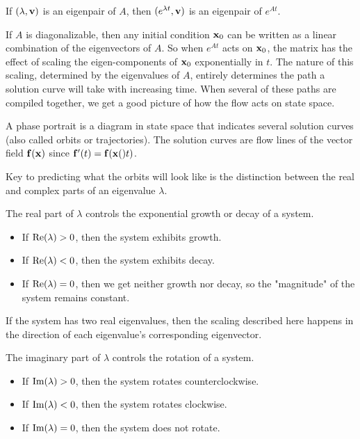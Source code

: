 \documentclass[../m082main.tex]{subfiles}
\begin{document}
\begin{theorem}
    If $(\lambda, \mathbf{v})$ is an eigenpair of $A$, then $(e^{\lambda t}, \mathbf{v})$ is an eigenpair of $e^{At}$.
\end{theorem}

If $A$ is diagonalizable, then any initial condition $\mathbf{x}_0$ can be written as a linear combination of the eigenvectors of $A$.
So when $e^{At}$ acts on $\mathbf{x}_0$, the matrix has the effect of scaling the eigen-components of $\mathbf{x}_0$ exponentially in $t$.
The nature of this scaling, determined by the eigenvalues of $A$, entirely determines the path a solution curve will take with increasing time.
When several of these paths are compiled together, we get a good picture of how the flow acts on state space.

\begin{definition}
    A phase portrait is a diagram in state space that indicates several solution curves (also called orbits or trajectories).
    The solution curves are flow lines of the vector field $\mathbf{f}(\mathbf{x})$ since $\mathbf{f}'(t) = \mathbf{f}(\mathbf{x}()t)$.
\end{definition}

Key to predicting what the orbits will look like is the distinction between the real and complex parts of an eigenvalue $\lambda$.

The real part of $\lambda$ controls the exponential growth or decay of a system.
\begin{itemize}
    \item If $\textrm{Re} (\lambda) > 0$, then the system exhibits growth.
    \item If $\textrm{Re} (\lambda) < 0$, then the system exhibits decay.
    \item If $\textrm{Re} (\lambda) = 0$, then we get neither growth nor decay, so the "magnitude" of the system remains constant.
\end{itemize}
If the system has two real eigenvalues, then the scaling described here happens in the direction of each eigenvalue's corresponding eigenvector.

The imaginary part of $\lambda$ controls the rotation of a system.
\begin{itemize}
    \item If $\textrm{Im} (\lambda) > 0$, then the system rotates counterclockwise.
    \item If $\textrm{Im} (\lambda) < 0$, then the system rotates clockwise.
    \item If $\textrm{Im} (\lambda) = 0$, then the system does not rotate.
\end{itemize}
\end{document}
